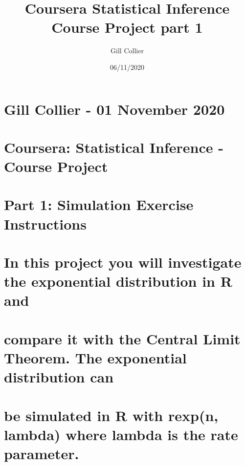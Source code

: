 \documentclass[
]{article}
\title{Coursera Statistical Inference Course Project part 1}
\author{Gill Collier}
\date{06/11/2020}
\begin{document}
\maketitle

\hypertarget{gill-collier---01-november-2020}{%
\section{Gill Collier - 01 November
2020}\label{gill-collier---01-november-2020}}

\hypertarget{coursera-statistical-inference---course-project}{%
\section{Coursera: Statistical Inference - Course
Project}\label{coursera-statistical-inference---course-project}}

\hypertarget{part-1-simulation-exercise-instructions}{%
\section{Part 1: Simulation Exercise
Instructions}\label{part-1-simulation-exercise-instructions}}

\hypertarget{in-this-project-you-will-investigate-the-exponential-distribution-in-r-and}{%
\section{In this project you will investigate the exponential
distribution in R
and}\label{in-this-project-you-will-investigate-the-exponential-distribution-in-r-and}}

\hypertarget{compare-it-with-the-central-limit-theorem.-the-exponential-distribution-can}{%
\section{compare it with the Central Limit Theorem. The exponential
distribution
can}\label{compare-it-with-the-central-limit-theorem.-the-exponential-distribution-can}}

\hypertarget{be-simulated-in-r-with-rexpn-lambda-where-lambda-is-the-rate-parameter.}{%
\section{be simulated in R with rexp(n, lambda) where lambda is the rate
parameter.}\label{be-simulated-in-r-with-rexpn-lambda-where-lambda-is-the-rate-parameter.}}
\end{document}
